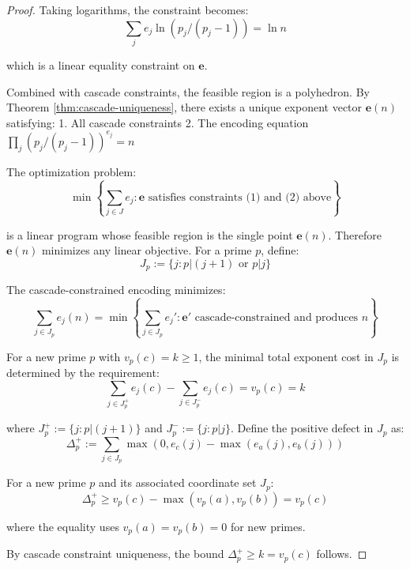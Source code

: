 \begin{proof}

Taking logarithms, the constraint becomes:
\begin{equation}
\sum_j e_j \ln(p_j/(p_j-1)) = \ln n
\end{equation}

which is a linear equality constraint on $\mathbf{e}$.

Combined with cascade constraints, the feasible region is a polyhedron. By Theorem \ref{thm:cascade-uniqueness}, there exists a unique exponent vector $\mathbf{e}(n)$ satisfying:
1. All cascade constraints
2. The encoding equation $\prod_j (p_j/(p_j-1))^{e_j} = n$

The optimization problem:
\begin{equation}
\min \left\{\sum_{j \in J} e_j : \mathbf{e} \text{ satisfies constraints (1) and (2) above}\right\}
\end{equation}

is a linear program whose feasible region is the single point $\mathbf{e}(n)$. Therefore $\mathbf{e}(n)$ minimizes any linear objective. For a prime $p$, define:
\begin{equation}
J_p := \{j : p | (j+1) \text{ or } p | j\}
\end{equation}

The cascade-constrained encoding minimizes:
\begin{equation}
\sum_{j \in J_p} e_j(n) = \min \left\{\sum_{j \in J_p} e_j' : \mathbf{e}' \text{ cascade-constrained and produces } n\right\}
\end{equation}

For a new prime $p$ with $v_p(c) = k \geq 1$, the minimal total exponent cost in $J_p$ is determined by the requirement:
\begin{equation}
\sum_{j \in J_p^+} e_j(c) - \sum_{j \in J_p^-} e_j(c) = v_p(c) = k
\end{equation}

where $J_p^+ := \{j : p | (j+1)\}$ and $J_p^- := \{j : p | j\}$. Define the positive defect in $J_p$ as:
\begin{equation}
\Delta_p^+ := \sum_{j \in J_p} \max(0, e_c(j) - \max(e_a(j), e_b(j)))
\end{equation}

\begin{lemma}
\label{lem:defect-valuation-correspondence}

For a new prime $p$ and its associated coordinate set $J_p$:
\begin{equation}
\Delta_p^+ \geq v_p(c) - \max(v_p(a), v_p(b)) = v_p(c)
\end{equation}

where the equality uses $v_p(a) = v_p(b) = 0$ for new primes.

\end{lemma}

By cascade constraint uniqueness, the bound $\Delta_p^+ \geq k = v_p(c)$ follows.

\end{proof}

